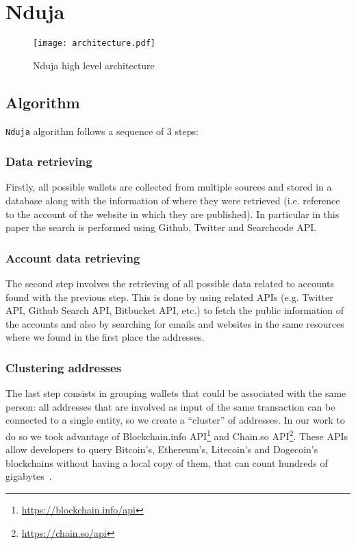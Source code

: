 \newcommand{\walletcollector}{\texttt{wallet\_collector}}
\newcommand{\userinforetriever}{\texttt{user\_info\_retriever}}
\newcommand{\addresschecker}{\texttt{address\_checker}}
\newcommand{\graph}{\texttt{graph}}

\section{Nduja} \label{nduja}

\begin{figure*}
    \centering
    \texttt{[image: architecture.pdf]}
    \caption{Nduja high level architecture}
    \label{fig:architecture}
\end{figure*}

\subsection{Algorithm}
\texttt{Nduja} algorithm follows a sequence of 3 steps:
\subsubsection*{Data retrieving} Firstly, all possible wallets are collected
from multiple sources and stored in a database along with the
information of where they were retrieved (i.e. reference to the account of the
website in which they are published). In particular in this paper the search is
performed using Github, Twitter and Searchcode API.

\subsubsection*{Account data retrieving} The second step involves the
retrieving of all possible data related to accounts found with the previous
step. This is done by using related APIs (e.g. Twitter API, Github Search API,
Bitbucket API, etc.) to fetch the public information of the accounts and also
by searching for emails and websites in the same resources where we found in
the first place the addresses.

\subsubsection*{Clustering addresses} The last step consists in grouping
wallets that could be associated with the same person: all addresses that are
involved as input of the same transaction can be connected to a single
entity, so we create a ``cluster'' of addresses. In our work to do so we
took advantage of
Blockchain.info API\footnote{\url{https://blockchain.info/api}} and
Chain.so API\footnote{\url{https://chain.so/api}}. These APIs allow
developers to query Bitcoin's, Ethereum's, Litecoin's and Dogecoin's
blockchains without having a local copy of them, that can count
hundreds of gigabytes~\cite{bib:bitinfochart}.

